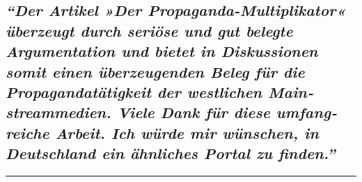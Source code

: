 \hypertarget{der-artikel-der-propaganda-multiplikator-uxfcberzeugt-durch-seriuxf6se-und-gut-belegte-argumentation-und-bietet-in-diskussionen-somit-einen-uxfcberzeugenden-beleg-fuxfcr-die-propagandatuxe4tigkeit-der-westlichen-mainstreammedien-viele-dank-fuxfcr-diese-umfangreiche-arbeit-ich-wuxfcrde-mir-wuxfcnschen-in-deutschland-ein-uxe4hnliches-portal-zu-finden}{%
\subsection{\texorpdfstring{\emph{``Der Artikel »Der
Propaganda-Multiplikator« überzeugt durch seriöse und gut belegte
Argumentation und bietet in Diskussionen somit einen überzeugenden Beleg
für die Propaganda­tätigkeit der westlichen Main­stream­medien. Viele
Dank für diese umfang­reiche Arbeit. Ich würde mir wünschen, in
Deutschland ein ähnliches Portal zu
finden.''}}{``Der Artikel »Der Propaganda-Multiplikator« überzeugt durch seriöse und gut belegte Argumentation und bietet in Diskussionen somit einen überzeugenden Beleg für die Propaganda­tätigkeit der westlichen Main­stream­medien. Viele Dank für diese umfang­reiche Arbeit. Ich würde mir wünschen, in Deutschland ein ähnliches Portal zu finden.''}}\label{der-artikel-der-propaganda-multiplikator-uxfcberzeugt-durch-seriuxf6se-und-gut-belegte-argumentation-und-bietet-in-diskussionen-somit-einen-uxfcberzeugenden-beleg-fuxfcr-die-propagandatuxe4tigkeit-der-westlichen-mainstreammedien-viele-dank-fuxfcr-diese-umfangreiche-arbeit-ich-wuxfcrde-mir-wuxfcnschen-in-deutschland-ein-uxe4hnliches-portal-zu-finden}}

\begin{center}\rule{0.5\linewidth}{\linethickness}\end{center}

